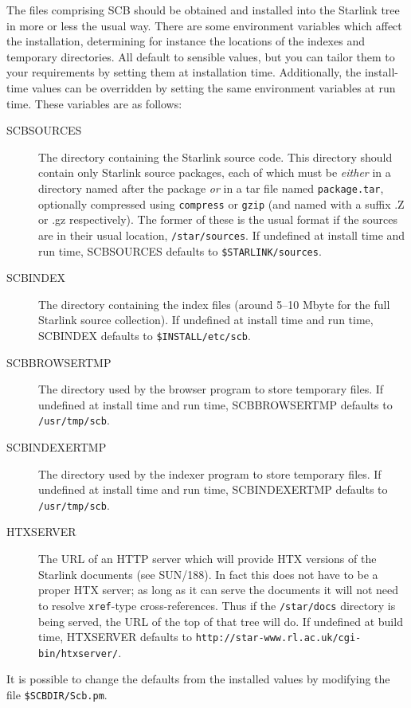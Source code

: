 \documentclass[twoside,11pt]{article}
\newcommand{\xref}[3]{#1}
\renewcommand{\_}{\texttt{\symbol{95}}}
\begin{document}
The files comprising SCB should be obtained and installed into
the Starlink tree in more or less the usual way.
There are some environment variables which affect the
installation, determining for instance the locations of the 
indexes and temporary directories.  
All default to sensible values, but
you can tailor them to your requirements by setting them at 
installation time.
Additionally, the install-time values can be overridden by
setting the same environment variables at run time.
These variables are as follows:
\begin{description}
\item[SCB\_SOURCES]
The directory containing the Starlink source code.  
This directory should contain only Starlink source packages,
each of which must be {\em either\/} in a directory named after the package
{\em or\/} in a tar file named {\tt package.tar}, optionally compressed
using {\tt compress} or {\tt gzip} (and named with a suffix .Z or .gz 
respectively).
The former of these is the usual format if the sources are in
their usual location, {\tt /star/sources}.
If undefined at install time and run time, SCB\_SOURCES 
defaults to {\tt \$STARLINK/sources}.
\item[SCB\_INDEX]
The directory containing the index files (around 5--10 Mbyte for the full
Starlink source collection).
If undefined at install time and run time, SCB\_INDEX defaults to
{\tt \$INSTALL/etc/scb}.
\item[SCB\_BROWSER\_TMP]
The directory used by the browser program to store temporary files. 
If undefined at install time and run time, SCB\_BROWSER\_TMP defaults to
{\tt /usr/tmp/scb}.
\item[SCB\_INDEXER\_TMP]
The directory used by the indexer program to store temporary files. 
If undefined at install time and run time, SCB\_INDEXER\_TMP defaults to
{\tt /usr/tmp/scb}.
\item[HTX\_SERVER]
The URL of an HTTP server which will provide HTX versions of the Starlink
documents (see \xref{SUN/188}{sun188}{remote_document_servers}).
In fact this does not have to be a proper HTX server; as long as it
can serve the documents it will not need to resolve {\tt xref\_}-type 
cross-references.
Thus if the {\tt /star/docs} directory is being served, the URL of
the top of that tree will do.
If undefined at build time, HTX\_SERVER defaults to 
{\tt http://star-www.rl.ac.uk/cgi-bin/htxserver/}.
\end{description}
It is possible to change the defaults from the installed values by
modifying the file {\tt \$SCB\_DIR/Scb.pm}.
\end{document}
